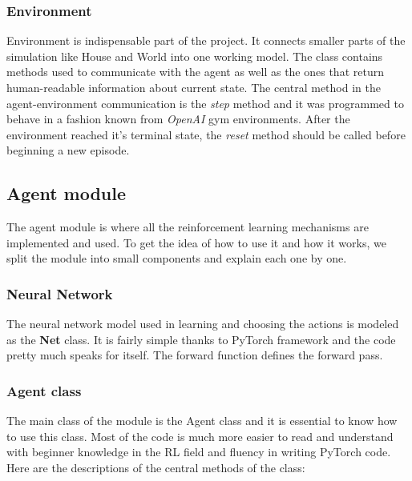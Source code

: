 \documentclass{article}
\begin{document}
\subsubsection{Environment}
Environment is indispensable part of the project. It connects smaller parts of the simulation like House and World into one working model. The class contains methods used to communicate with the agent as well as the ones that return human-readable information about current state. The central method in the agent-environment communication is the \textit{step} method and it was programmed to behave in a fashion known from \textit{OpenAI} gym environments. After the environment reached it's terminal state, the \textit{reset} method should be called before beginning a new episode. 

\subsection{Agent module}
The agent module is where all the reinforcement learning mechanisms are implemented and used. To get the idea of how to use it and how it works, we split the module into small components and explain each one by one.
\subsubsection{Neural Network}
The neural network model used in learning and choosing the actions is modeled as the \textbf{Net} class. It is fairly simple thanks to PyTorch framework and the code pretty much speaks for itself. The forward function defines the forward pass.

\subsubsection{Agent class}
The main class of the module is the Agent class and it is essential to know how to use this class. Most of the code is much more easier to read and understand with beginner knowledge in the RL field and fluency in writing PyTorch code. Here are the descriptions of the central methods of the class:
\end{document}
